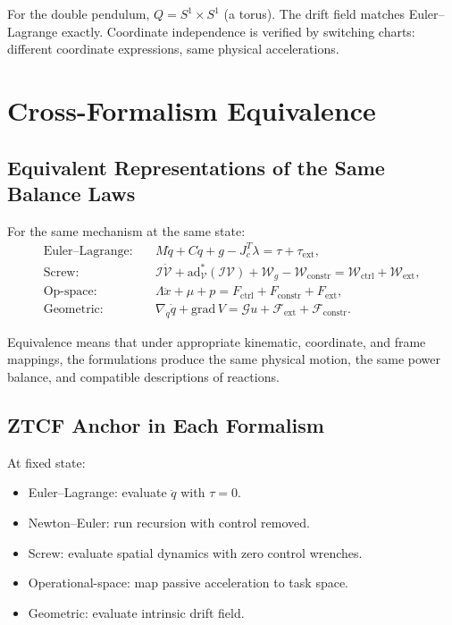 \documentclass[11pt]{article}
\begin{document}
For the double pendulum, $Q = S^1\times S^1$ (a torus). The drift field matches Euler--Lagrange exactly. Coordinate independence is verified by switching charts: different coordinate expressions, same physical accelerations.


\section{Cross-Formalism Equivalence}\label{sec:cross-formalism}

\subsection{Equivalent Representations of the Same Balance Laws}

For the same mechanism at the same state:
\begin{align}
\text{Euler--Lagrange:}\quad & M\ddot{q}+C\dot{q}+g-J_c^T\lambda = \tau+\tau_{\mathrm{ext}}, \\
\text{Screw:}\quad & \mathcal{I}\dot{\mathcal{V}}+\mathrm{ad}_{\mathcal{V}}^*(\mathcal{I}\mathcal{V})+\mathcal{W}_g-\mathcal{W}_{\mathrm{constr}} = \mathcal{W}_{\mathrm{ctrl}}+\mathcal{W}_{\mathrm{ext}}, \\
\text{Op-space:}\quad & \Lambda\ddot{x}+\mu+p = F_{\mathrm{ctrl}}+F_{\mathrm{constr}}+F_{\mathrm{ext}}, \\
\text{Geometric:}\quad & \nabla_{\dot{q}}\dot{q}+\mathrm{grad}\,V = \mathcal{G}u+\mathcal{F}_{\mathrm{ext}}+\mathcal{F}_{\mathrm{constr}}.
\end{align}

Equivalence means that under appropriate kinematic, coordinate, and frame mappings, the formulations produce the same physical motion, the same power balance, and compatible descriptions of reactions.

\subsection{ZTCF Anchor in Each Formalism}

At fixed state:
\begin{itemize}
\item Euler--Lagrange: evaluate $\ddot{q}$ with $\tau=0$.
\item Newton--Euler: run recursion with control removed.
\item Screw: evaluate spatial dynamics with zero control wrenches.
\item Operational-space: map passive acceleration to task space.
\item Geometric: evaluate intrinsic drift field.
\end{itemize}
\end{document}
